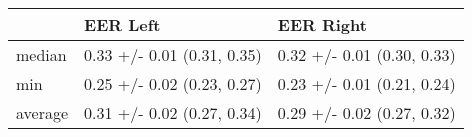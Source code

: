 \begin{tabular}{lll}
\toprule
{} &                    EER Left &                   EER Right \\
\midrule
median  &  0.33 +/- 0.01 (0.31, 0.35) &  0.32 +/- 0.01 (0.30, 0.33) \\
min     &  0.25 +/- 0.02 (0.23, 0.27) &  0.23 +/- 0.01 (0.21, 0.24) \\
average &  0.31 +/- 0.02 (0.27, 0.34) &  0.29 +/- 0.02 (0.27, 0.32) \\
\bottomrule
\end{tabular}
